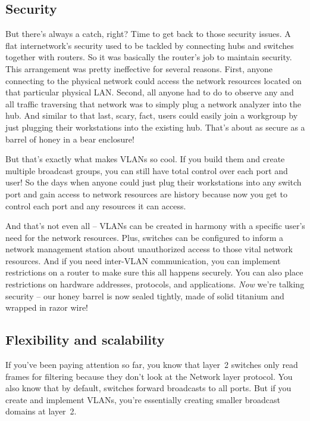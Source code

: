 \subsection{Security}

But there's always a catch, right? Time to get back to those security
issues. A flat internetwork's security used to be tackled by connecting
hubs and switches together with routers. So it was basically the
router's job to maintain security. This arrangement was pretty
ineffective for several reasons. First, anyone connecting to the
physical network could access the network resources located on that
particular physical LAN. Second, all anyone had to do to observe any and
all traffic traversing that network was to simply plug a network
analyzer into the hub. And similar to that last, scary, fact, users
could easily join a workgroup by just plugging their workstations into
the existing hub. That's about as secure as a barrel of honey in a bear
enclosure!

But that's exactly what makes VLANs so cool. If you build them and
create multiple broadcast groups, you can still have total control over
each port and user! So the days when anyone could just plug their
workstations into any switch port and gain access to network resources
are history because now you get to control each port and any resources
it can access.

And that's not even all -- VLANs can be created in harmony with a
specific user's need for the network resources. Plus, switches can be
configured to inform a network management station about unauthorized
access to those vital network resources. And if you need inter-VLAN
communication, you can implement restrictions on a router to make sure
this all happens securely. You can also place restrictions on hardware
addresses, protocols, and applications. \emph{Now} we're talking
security -- our honey barrel is now sealed tightly, made of solid
titanium and wrapped in razor wire!

\subsection{Flexibility and scalability}

If you've been paying attention so far, you know that layer~2 switches only read frames for filtering because they don't look at the Network layer protocol.
You also know that by default, switches forward broadcasts to all ports. But if you create and implement VLANs, you're essentially creating smaller broadcast domains at layer~2.


